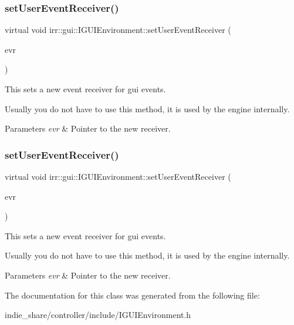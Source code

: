 \subsubsection{\texorpdfstring{set\+User\+Event\+Receiver()}{setUserEventReceiver()}\hspace{0.1cm}{\footnotesize\ttfamily [1/2]}}
{\footnotesize\ttfamily virtual void irr\+::gui\+::\+I\+G\+U\+I\+Environment\+::set\+User\+Event\+Receiver (\begin{DoxyParamCaption}\item[{\hyperlink{classirr_1_1IEventReceiver}{I\+Event\+Receiver} $\ast$}]{evr }\end{DoxyParamCaption})\hspace{0.3cm}{\ttfamily [pure virtual]}}



This sets a new event receiver for gui events. 

Usually you do not have to use this method, it is used by the engine internally. 
\begin{DoxyParams}{Parameters}
{\em evr} & Pointer to the new receiver. \\
\hline
\end{DoxyParams}
\mbox{\label{classirr_1_1gui_1_1IGUIEnvironment_a2491715aa30894c66357eb0451aa10b0}} 
\subsubsection{\texorpdfstring{set\+User\+Event\+Receiver()}{setUserEventReceiver()}\hspace{0.1cm}{\footnotesize\ttfamily [2/2]}}
{\footnotesize\ttfamily virtual void irr\+::gui\+::\+I\+G\+U\+I\+Environment\+::set\+User\+Event\+Receiver (\begin{DoxyParamCaption}\item[{\hyperlink{classirr_1_1IEventReceiver}{I\+Event\+Receiver} $\ast$}]{evr }\end{DoxyParamCaption})\hspace{0.3cm}{\ttfamily [pure virtual]}}



This sets a new event receiver for gui events. 

Usually you do not have to use this method, it is used by the engine internally. 
\begin{DoxyParams}{Parameters}
{\em evr} & Pointer to the new receiver. \\
\hline
\end{DoxyParams}


The documentation for this class was generated from the following file\+:\begin{DoxyCompactItemize}
\item 
indie\+\_\+share/controller/include/I\+G\+U\+I\+Environment.\+h\end{DoxyCompactItemize}
